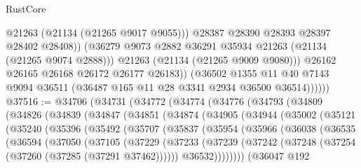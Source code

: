 \begin{lexlean}{RustCore}
\begin{coremodule}
                        @21263
                        (@21134 (@21265 @9017 @9055)))
                      @28387
                      @28390
                      @28393
                      @28397
                      @28402
                      @28408))
                  (@36279 @9073 @2882 @36291 @35934 @21263 (@21134 (@21265 @9074 @2888)))
                  @21263
                  (@21134 (@21265 @9009 @9080)))
                @26162
                @26165
                @26168
                @26172
                @26177
                @26183))
            (@36502
              @1355
              @11
              @40
              @7143
              @9094
              @36511
              (@36487 @165 @11 @28 @3341 @2934 @36500 @36514))))))
@37516 := @34706
    (@34731
      (@34772
        (@34774
          (@34776
            (@34793
              (@34809
                (@34826
                  (@34839
                    (@34847
                      (@34851
                        (@34874
                          (@34905
                            (@34944
                              (@35002
                                (@35121
                                  (@35240
                                    (@35396
                                      (@35492
                                        (@35707
                                          (@35837
                                            (@35954
                                              (@35966
                                                (@36038
                                                  (@36535
                                                    (@36594
                                                      (@37050
                                                        (@37105
                                                          (@37229
                                                            (@37233
                                                              (@37239
                                                                (@37242
                                                                  (@37248
                                                                    (@37254
                                                                      (@37260
                                                                        (@37285 (@37291 @37462))))))
                                                                @36532))))))))
                                                (@36047
                                                  @192

\end{coremodule}
\end{lexlean}
